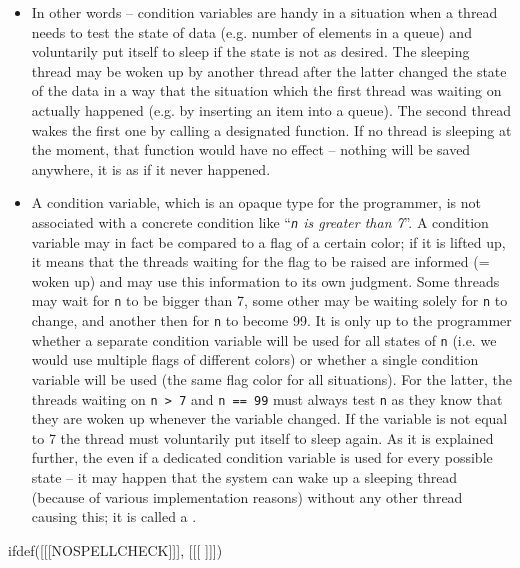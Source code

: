 \begin{itemize}
\item In other words -- condition variables are handy in a situation when a
thread needs to test the state of  data (e.g. number of elements in
a queue) and voluntarily put itself to sleep if the state is not as desired.
The sleeping thread may be woken up by another thread after the latter
changed the state of the data in a way that the situation which the first thread
was waiting on actually happened (e.g. by inserting an item into a queue).  The
second thread wakes the first one by calling a designated function.  If no
thread is sleeping at the moment, that function would have no effect -- nothing
will be saved anywhere, it is as if it never happened.
\item A condition variable, which is an opaque type for the programmer, is not
associated with a concrete condition like ``\emph{\texttt{n} is greater than
7}''.  A condition variable may in fact be compared to a flag of a certain
color; if it is lifted up, it means that the threads waiting for the flag to be
raised are informed (= woken up) and may use this information to its own
judgment.  Some threads may wait for \texttt{n} to be bigger than 7, some other
may be waiting solely for \texttt{n} to change, and another then for \texttt{n}
to become 99.  It is only up to the programmer whether a separate condition
variable will be used for all states of \texttt{n} (i.e. we would use multiple
flags of different colors) or whether a single condition variable will be used
(the same flag color for all situations).  For the latter, the threads waiting
on \texttt{n > 7} and \texttt{n == 99} must always test \texttt{n} as they know
that they are woken up whenever the variable changed.  If the variable is not
equal to 7 the thread must voluntarily put itself to sleep again.  As it is
explained further, the  even if a dedicated condition variable is used for every possible
state -- it may happen that the system can wake up a sleeping thread (because
of various implementation reasons) without any other thread causing this; it is
called a .
\end{itemize}


ifdef([[[NOSPELLCHECK]]], [[[
]]])

